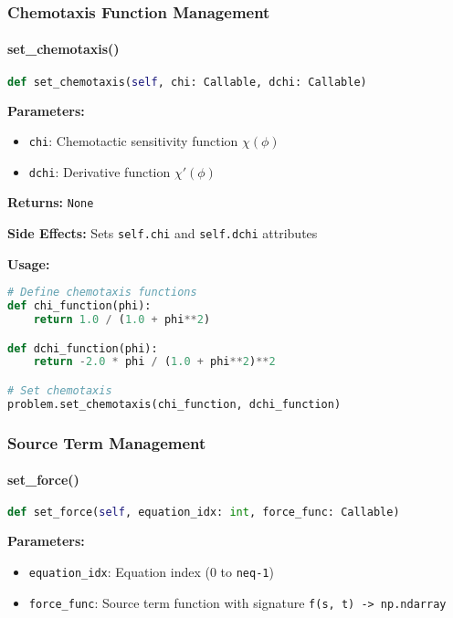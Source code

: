 \subsubsection{Chemotaxis Function Management}

\paragraph{set\_chemotaxis()}\leavevmode

\begin{lstlisting}[language=Python, caption=Set Chemotaxis Method]
def set_chemotaxis(self, chi: Callable, dchi: Callable)
\end{lstlisting}

\textbf{Parameters:}
\begin{itemize}
    \item \texttt{chi}: Chemotactic sensitivity function $\chi(\phi)$
    \item \texttt{dchi}: Derivative function $\chi'(\phi)$
\end{itemize}

\textbf{Returns:} \texttt{None}

\textbf{Side Effects:} Sets \texttt{self.chi} and \texttt{self.dchi} attributes

\textbf{Usage:}
\begin{lstlisting}[language=Python, caption=Chemotaxis Usage Example]
# Define chemotaxis functions
def chi_function(phi):
    return 1.0 / (1.0 + phi**2)

def dchi_function(phi):
    return -2.0 * phi / (1.0 + phi**2)**2

# Set chemotaxis
problem.set_chemotaxis(chi_function, dchi_function)
\end{lstlisting}

\subsubsection{Source Term Management}

\paragraph{set\_force()}\leavevmode
\begin{lstlisting}[language=Python, caption=Set Force Method]
def set_force(self, equation_idx: int, force_func: Callable)
\end{lstlisting}

\textbf{Parameters:}
\begin{itemize}
    \item \texttt{equation\_idx}: Equation index (0 to \texttt{neq-1})
    \item \texttt{force\_func}: Source term function with signature \texttt{f(s, t) -> np.ndarray}
\end{itemize}


